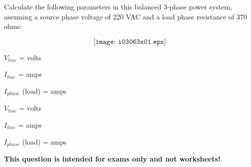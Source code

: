 

Calculate the following parameters in this balanced 3-phase power system, assuming a source phase voltage of 220 VAC and a load phase resistance of 370 ohms:

$$\texttt{[image: i03063x01.eps]}$$

$V_{line}$ = \underbar{\hskip 50pt} volts

\vskip 10pt

$I_{line}$ = \underbar{\hskip 50pt} amps

\vskip 10pt

$I_{phase}$ (load) = \underbar{\hskip 50pt} amps







$V_{line}$ =  volts

$I_{line}$ =  amps

$I_{phase}$ (load) =  amps







{\bf This question is intended for exams only and not worksheets!}.


